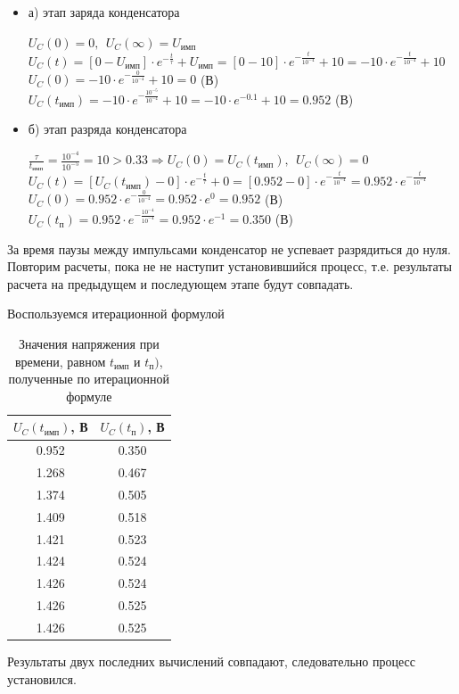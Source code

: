 \begin{itemize}
\item[] а) этап заряда конденсатора

		$U_C(0) = 0,\ \ U_C(\infty) = U_\text{имп}$\\	
		$U_C(t) = [0 - U_\text{имп}] \cdot e^{-\frac{t}{\tau}} + U_\text{имп} = [0 - 10] \cdot e^{-\frac{t}{10^{-4}}} + 10 = -10 \cdot e^{-\frac{t}{10^{-4}}} + 10$\\
		$U_C(0) = -10 \cdot e^{-\frac{0}{10^{-4}}} + 10 = 0$ (В)\\
		$U_C(t_\text{имп}) = -10 \cdot e^{-\frac{10^{-5}}{10^{-4}}} + 10 = -10 \cdot e^{-0.1} + 10 = 0.952$ (В)\\
		
\item[] б) этап разряда конденсатора
	
		$\frac{\tau}{t_\text{имп}} = \frac{10^{-4}}{10^{-5}} = 10 > 0.33 \Rightarrow U_C(0) = U_C(t_\text{имп}),\ \ U_C(\infty) = 0$\\
		$U_C(t) = [U_C(t_\text{имп}) - 0] \cdot e^{-\frac{t}{\tau}} + 0 =  [0.952 - 0] \cdot e^{-\frac{t}{10^{-4}}} = 0.952 \cdot e^{-\frac{t}{10^{-4}}}$\\
		$U_C(0) = 0.952 \cdot e^{-\frac{0}{10^{-4}}} = 0.952 \cdot e^0 = 0.952$ (В)\\
		$U_C(t_\text{п}) = 0.952 \cdot e^{-\frac{10^{-4}}{10^{-4}}} = 0.952 \cdot e^{-1} = 0.350$ (В)\\
		
\end{itemize}

	За время паузы между импульсами конденсатор не успевает разрядиться до нуля. Повторим расчеты, пока не не наступит установившийся процесс, т.е. результаты расчета на предыдущем и последующем этапе будут совпадать.	
	
	Воспользуемся итерационной формулой
\begin{table}[H]

	\begin{center}
	\caption{Значения напряжения при времени, равном $t_\text{имп}$ и $t_\text{п})$, полученные по итерационной формуле}
	\begin{tabular}{|c|c|}
		\hline 
		$U_C(t_\text{имп})$, В & $U_C(t_\text{п})$, В \\ 
		\hline 
		0.952 & 0.350 \\ 
		\hline 
		1.268 & 0.467 \\ 
		\hline 
		1.374 & 0.505 \\ 
		\hline 
		1.409 & 0.518 \\ 
		\hline 
		1.421 & 0.523 \\ 
		\hline 
		1.424 & 0.524 \\ 
		\hline 
		1.426 & 0.524 \\ 
		\hline 
		1.426 & 0.525 \\ 
		\hline 
		1.426 & 0.525 \\ 
		\hline 
		\end{tabular} 	
		
	\end{center}
\end{table}
	Результаты двух последних вычислений совпадают, следовательно процесс установился.\\
	
